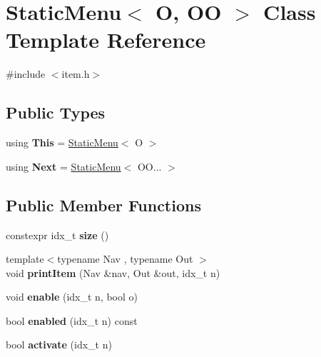 \hypertarget{classStaticMenu}{}\section{Static\+Menu$<$ O, OO $>$ Class Template Reference}
\label{classStaticMenu}


{\ttfamily \#include $<$item.\+h$>$}

\subsection*{Public Types}
\begin{DoxyCompactItemize}
\item 
\mbox{\label{classStaticMenu_a7f85c6372e63aad97a04ba77bfc71d72}} 
using {\bfseries This} = \hyperlink{classStaticMenu}{Static\+Menu}$<$ O $>$
\item 
\mbox{\label{classStaticMenu_a49c756734772bf3d463ad2f9144a64ee}} 
using {\bfseries Next} = \hyperlink{classStaticMenu}{Static\+Menu}$<$ O\+O... $>$
\end{DoxyCompactItemize}
\subsection*{Public Member Functions}
\begin{DoxyCompactItemize}
\item 
\mbox{\label{classStaticMenu_a0a4a421388d377bc5ea2653b4770df04}} 
constexpr idx\+\_\+t {\bfseries size} ()
\item 
\mbox{\label{classStaticMenu_aea48e4c8d7a5ae393a7a8adc102ecfa4}} 
{\footnotesize template$<$typename Nav , typename Out $>$ }\\void {\bfseries print\+Item} (Nav \&nav, Out \&out, idx\+\_\+t n)
\item 
\mbox{\label{classStaticMenu_a58dd802f1e5389f419b7ecd1b2a2a75d}} 
void {\bfseries enable} (idx\+\_\+t n, bool o)
\item 
\mbox{\label{classStaticMenu_a62ceaf6b9e069c792628121a35ea1e84}} 
bool {\bfseries enabled} (idx\+\_\+t n) const
\item 
\mbox{\label{classStaticMenu_a93a563ede4fd064c9a96eb176d562ed2}} 
bool {\bfseries activate} (idx\+\_\+t n)
\end{DoxyCompactItemize}

